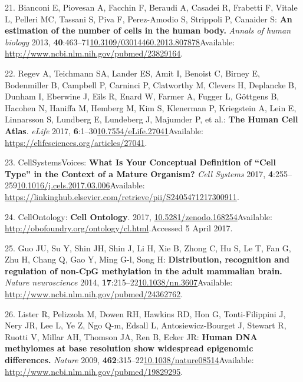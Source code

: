\documentclass[
]{book}
\begin{document}
\leavevmode\hypertarget{ref-Bianconi2013}{}%
21. Bianconi E, Piovesan A, Facchin F, Beraudi A, Casadei R, Frabetti F, Vitale L, Pelleri MC, Tassani S, Piva F, Perez-Amodio S, Strippoli P, Canaider S: \textbf{An estimation of the number of cells in the human body.} \emph{Annals of human biology} 2013, \textbf{40}:463--71\href{https://doi.org/10.3109/03014460.2013.807878}{10.3109/03014460.2013.807878}Available: \url{http://www.ncbi.nlm.nih.gov/pubmed/23829164}.

\leavevmode\hypertarget{ref-Regev2017}{}%
22. Regev A, Teichmann SA, Lander ES, Amit I, Benoist C, Birney E, Bodenmiller B, Campbell P, Carninci P, Clatworthy M, Clevers H, Deplancke B, Dunham I, Eberwine J, Eils R, Enard W, Farmer A, Fugger L, Göttgens B, Hacohen N, Haniffa M, Hemberg M, Kim S, Klenerman P, Kriegstein A, Lein E, Linnarsson S, Lundberg E, Lundeberg J, Majumder P, et al.: \textbf{The Human Cell Atlas}. \emph{eLife} 2017, \textbf{6}:1--30\href{https://doi.org/10.7554/eLife.27041}{10.7554/eLife.27041}Available: \url{https://elifesciences.org/articles/27041}.

\leavevmode\hypertarget{ref-CellSystemsCellType2017}{}%
23. CellSystemsVoices: \textbf{What Is Your Conceptual Definition of ``Cell Type'' in the Context of a Mature Organism?} \emph{Cell Systems} 2017, \textbf{4}:255--259\href{https://doi.org/10.1016/j.cels.2017.03.006}{10.1016/j.cels.2017.03.006}Available: \url{https://linkinghub.elsevier.com/retrieve/pii/S2405471217300911}.

\leavevmode\hypertarget{ref-CellOntologyOBO}{}%
24. CellOntology: \textbf{Cell Ontology}. 2017, \href{https://doi.org/10.5281/zenodo.168254}{10.5281/zenodo.168254}Available: \url{http://obofoundry.org/ontology/cl.html}.Accessed 5 April 2017.

\leavevmode\hypertarget{ref-Guo2014a}{}%
25. Guo JU, Su Y, Shin JH, Shin J, Li H, Xie B, Zhong C, Hu S, Le T, Fan G, Zhu H, Chang Q, Gao Y, Ming G-l, Song H: \textbf{Distribution, recognition and regulation of non-CpG methylation in the adult mammalian brain.} \emph{Nature neuroscience} 2014, \textbf{17}:215--22\href{https://doi.org/10.1038/nn.3607}{10.1038/nn.3607}Available: \url{http://www.ncbi.nlm.nih.gov/pubmed/24362762}.

\leavevmode\hypertarget{ref-Lister2009}{}%
26. Lister R, Pelizzola M, Dowen RH, Hawkins RD, Hon G, Tonti-Filippini J, Nery JR, Lee L, Ye Z, Ngo Q-m, Edsall L, Antosiewicz-Bourget J, Stewart R, Ruotti V, Millar AH, Thomson JA, Ren B, Ecker JR: \textbf{Human DNA methylomes at base resolution show widespread epigenomic differences.} \emph{Nature} 2009, \textbf{462}:315--22\href{https://doi.org/10.1038/nature08514}{10.1038/nature08514}Available: \url{http://www.ncbi.nlm.nih.gov/pubmed/19829295}.
\end{document}
